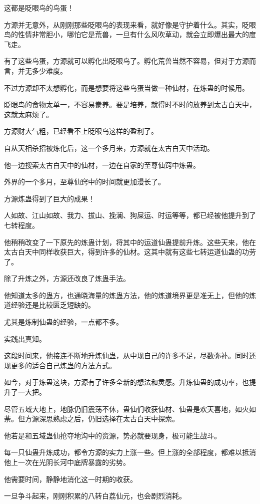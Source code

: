 \begin{this_body}
这都是眨眼鸟的鸟蛋！

方源并无意外，从刚刚那些眨眼鸟的表现来看，就好像是守护着什么。其实，眨眼鸟的性情非常胆小，哪怕它是荒兽，一旦有什么风吹草动，就会立即爆出最大的度飞走。

有了这些鸟蛋，方源就可以孵化出眨眼鸟了。孵化荒兽当然不容易，但对于方源而言，并无多少难度。

不过方源却不太想孵化，而是想要将这些鸟蛋当做一种仙材，在炼蛊的时候用。

眨眼鸟的食物太单一，不容易豢养。要是培养，就得时不时的放养到太古白天中，这就太麻烦了。

方源财大气粗，已经看不上眨眼鸟这样的盈利了。

自从天相杀招被炼化后，这一个多月来，方源就在太古白天中活动。

他一边搜索太古白天中的仙材，一边在自家的至尊仙窍中炼蛊。

外界的一个多月，至尊仙窍中的时间就更加漫长了。

方源炼蛊得到了巨大的成果！

人如故、江山如故、我力、拔山、挽澜、狗屎运、时运等等，都已经被他提升到了七转程度。

他稍稍改变了一下原先的炼蛊计划，将其中的运道仙蛊提前升炼。这些天来，他在太古白天中同样收获巨大，得到许多的仙材。这其中就有这些七转运道仙蛊的功劳了。

除了升炼之外，方源还改良了炼蛊手法。

他知道太多的蛊方，也通晓海量的炼蛊方法，他的炼道境界更是准无上，但他的炼道经验还是比较匮乏短缺的。

尤其是炼制仙蛊的经验，一点都不多。

实践出真知。

这段时间来，他接连不断地升炼仙蛊，从中现自己的许多不足，尽数弥补。同时还现更多的适合自己炼蛊的方法方式。

如今，对于炼蛊这块，方源有了许多全新的想法和灵感。升炼仙蛊的成功率，也提升了一大把。

尽管五域大地上，地脉仍旧震荡不休，蛊仙们收获仙材、仙蛊是欢天喜地，如火如荼。但方源深思熟虑之后，仍旧选择在太古白天中探索。

他若是和五域蛊仙抢夺地沟中的资源，势必就要现身，极可能生战斗。

每一只仙蛊升炼成功，都令方源的实力上涨一些。但上涨的全部程度，都难以抵消他上一次在光阴长河中底牌暴露的劣势。

他需要时间，静静地消化这一时期的收获。

一旦争斗起来，刚刚积累的八转白荔仙元，也会剧烈消耗。


\end{this_body}
